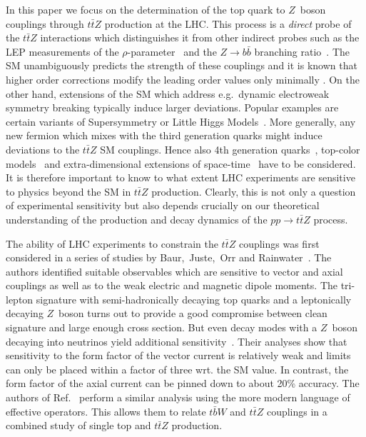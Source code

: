 \documentclass{JHEP3}
\def\ttbZ{t\bar{t}Z}
\begin{document}
In this paper we focus on the determination of the top quark to $Z$~boson couplings through $\ttbZ$ production at the LHC. 
This process is a {\it direct} probe of the $\ttbZ$ interactions which distinguishes it from other indirect probes such as 
the LEP measurements of the $\rho$-parameter~\cite{ALEPH:2005ab} and the $Z \to b \bar{b}$ branching ratio~\cite{Abdallah:2008ab}. 
The SM unambiguously predicts the strength of these couplings and it is known that higher order corrections modify the leading order values only minimally \cite{Hollik:1988ii}.
On the other hand, extensions of the SM which address e.g.~dynamic electroweak symmetry breaking typically induce larger deviations. 
Popular examples are certain variants of Supersymmetry \cite{PhysRevD.82.055001,PhysRevD.84.015003} or Little Higgs Models~\cite{Schmaltz:2002wx,Cheng:2003ju}.
More generally, any new fermion which mixes with the third generation quarks might induce deviations to the $\ttbZ$ SM couplings. 
Hence also 4th generation quarks~\cite{Frampton:1999xi,Dobrescu:2009vz}, top-color models~\cite{PhysRevD.86.095017} and extra-dimensional extensions of space-time~\cite{Randall:1999ee} 
have to be considered.
It is therefore important to know to what extent LHC experiments are sensitive to physics beyond the SM in $\ttbZ$ production.
Clearly, this is not only a question of experimental sensitivity but also depends crucially on our theoretical understanding of the production and decay dynamics 
of the $pp\to\ttbZ$ process.

The ability of LHC experiments to constrain the $\ttbZ$ couplings was first considered in a series of studies by Baur,~Juste,~Orr and Rainwater~\cite{Baur:2004uw,Baur:2005wi}. 
The authors identified suitable observables which are sensitive to vector and axial couplings as well as to the weak electric and magnetic dipole moments.
The tri-lepton signature with semi-hadronically decaying top quarks and a leptonically decaying $Z$~boson turns out to provide a good compromise between
clean signature and large enough cross section. 
But even decay modes with a $Z$~boson decaying into neutrinos yield additional sensitivity~\cite{Baur:2005wi}.
Their analyses show that sensitivity to the form factor of the vector current is relatively weak and limits can only be placed within a factor of three wrt. the SM value. 
In contrast, the form factor of the axial current can be pinned down to about 20\% accuracy. 
The authors of Ref.~\cite{Berger:2009hi} perform a similar analysis using the more modern language of effective operators.
This allows them to relate $t\bar{b}W$ and $\ttbZ$ couplings in a combined study of single top and $\ttbZ$ production.
\end{document}
